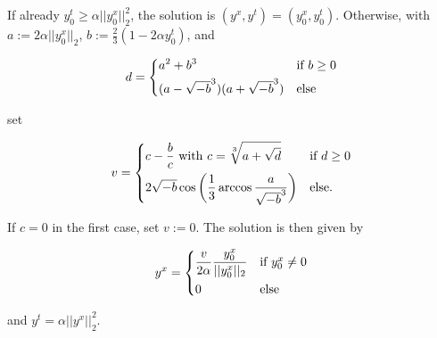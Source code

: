 
                    \begin{algorithm}


                        If already $y_{0}^{t} \ge \alpha ||y_{0}^{x}||_{2}^{2}$, the solution is $(y^{x}, y^{t}) = (y_{0}^{x}, y_{0}^{t})$. Otherwise, with $a := 2 \alpha ||y_{0}^{x}||_{2}$, $b := \frac{2}{3} (1 - 2 \alpha y_{0}^{t})$, and

                            \[
                                d =
                                    \begin{dcases*}
                                        a^{2} + b^{3} & \textnormal{if $b \ge 0$}\\
                                        (a - \sqrt{-b}^{3})(a + \sqrt{-b}^{3}) & \textnormal{else}
                                    \end{dcases*}
                            \]

                        set

                            \[
                                v =
                                    \begin{dcases*}
                                        c - \frac{b}{c} \,\, \textnormal{with} \,\, c = \sqrt[3]{a + \sqrt{d}} & \textnormal{if $d \ge 0$}\\
                                        2 \sqrt{-b} \cos \bigg( \frac{1}{3} \arccos \frac{a}{\sqrt{-b}^{3}} \bigg) & \textnormal{else}.
                                    \end{dcases*}
                            \]

                        If $c = 0$ in the first case, set $v := 0$. The solution is then given by

                            \[
                                y^{x} =
                                    \begin{dcases*}
                                        \frac{v}{2\alpha} \frac{y_{0}^{x}}{||y_{0}^{x}||_{2}} & \textnormal{if $y_{0}^{x} \ne 0$}\\
                                        0 & \textnormal{else}
                                    \end{dcases*}
                            \]

                        and $y^{t} = \alpha ||y^{x}||_{2}^{2}$.
                    \end{algorithm}

